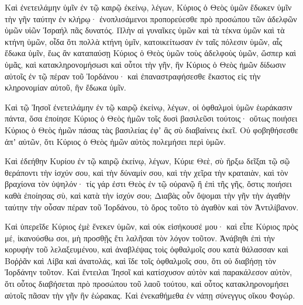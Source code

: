 {\par }{\PP {}Καὶ ἐνετειλάμην ὑμῖν ἐν τῷ καιρῷ ἐκείνῳ, λέγων, Κύριος ὁ Θεὸς ὑμῶν ἔδωκεν ὑμῖν τὴν γῆν ταύτην ἐν κλήρῳ· ἐνοπλισάμενοι προπορεύεσθε πρὸ προσώπου τῶν ἀδελφῶν ὑμῶν υἱῶν Ἰσραήλ πᾶς δυνατός.
Πλὴν αἱ γυναῖκες ὑμῶν καὶ τὰ τέκνα ὑμῶν καὶ τὰ κτήνη ὑμῶν, οἶδα ὅτι πολλὰ κτήνη ὑμῖν, κατοικείτωσαν ἐν ταῖς πόλεσιν ὑμῶν, αἷς ἔδωκα ὑμῖν, ἕως ἂν καταπαύσῃ Κύριος ὁ
Θεὸς ὑμῶν τοὺς ἀδελφοὺς ὑμῶν, ὥσπερ καὶ ὑμᾶς, καὶ κατακληρονομήσωσι καὶ οὗτοι τὴν γῆν, ἣν Κύριος ὁ Θεὸς ἡμῶν δίδωσιν αὐτοῖς ἐν τῷ πέραν τοῦ Ἰορδάνου· καὶ ἐπαναστραφήσεσθε ἕκαστος εἰς τὴν κληρονομίαν αὐτοῦ, ἣν ἔδωκα ὑμῖν.
\par }{\PP {}Καὶ τῷ Ἰησοῖ ἐνετειλάμην ἐν τῷ καιρῷ ἐκείνῳ, λέγων, οἱ ὀφθαλμοὶ ὑμῶν ἑωράκασιν πάντα, ὅσα ἐποίησε Κύριος ὁ Θεὸς ἡμῶν τοῖς δυσὶ βασιλεῦσι τούτοις· οὕτως ποιήσει Κύριος ὁ Θεὸς ἡμῶν πάσας τὰς βασιλείας ἐφʼ ἃς σὺ διαβαίνεις ἐκεῖ.
Οὐ φοβηθήσεσθε ἀπʼ αὐτῶν, ὅτι Κύριος ὁ Θεὸς ἡμῶν αὐτὸς πολεμήσει περὶ ὑμῶν.
\par }{\PP {}Καὶ ἐδεήθην Κυρίου ἐν τῷ καιρῷ ἐκείνῳ, λέγων,
Κύριε Θεὲ, σὺ ἤρξω δεῖξαι τῷ σῷ θεράποντι τὴν ἰσχύν σου, καὶ τὴν δύναμίν σου, καὶ τὴν χεῖρα τὴν κραταιὰν, καὶ τὸν βραχίονα τὸν ὑψηλόν· τίς γάρ ἐστι Θεὸς ἐν τῷ οὐρανῷ ἢ ἐπὶ τῆς γῆς, ὅστις ποιήσει καθὰ ἐποίησας σὺ, καὶ κατὰ τὴν ἰσχύν σου;
Διαβὰς οὖν ὄψομαι τὴν γῆν τὴν ἀγαθὴν ταύτην τὴν οὖσαν πέραν τοῦ Ἰορδάνου, τὸ ὄρος τοῦτο τὸ ἀγαθὸν καὶ τὸν Ἀντιλίβανον.
\par }{\PP {}Καὶ ὑπερεῖδε Κύριος ἐμὲ ἕνεκεν ὑμῶν, καὶ οὐκ εἰσήκουσέ μου· καὶ εἶπε Κύριος πρὸς μέ, ἱκανούσθω σοι, μὴ προσθῇς ἔτι λαλῆσαι τὸν λόγον τοῦτον.
Ἀνάβηθι ἐπὶ τὴν κορυφὴν τοῦ λελαξευμένου, καὶ ἀναβλέψας τοὶς ὀφθαλμοῖς σου κατὰ θάλασσαν καὶ Βοῤῥᾶν καὶ Λίβα καὶ ἀνατολάς, καὶ ἴδε τοῖς ὀφθαλμοῖς σου, ὅτι οὐ διαβήσῃ τὸν Ἰορδάνην τοῦτον.
Καὶ ἔντειλαι Ἰησοῖ καὶ κατίσχυσον αὐτὸν καὶ παρακάλεσον αὐτὸν, ὅτι οὗτος διαβήσεται πρὸ προσώπου τοῦ λαοῦ τούτου, καὶ οὗτος κατακληρονομήσει αὐτοῖς πᾶσαν τὴν γῆν ἣν ἑώρακας.
Καὶ ἐνεκαθήμεθα ἐν νάπῃ σύνεγγυς οἴκου Φογώρ.

}
